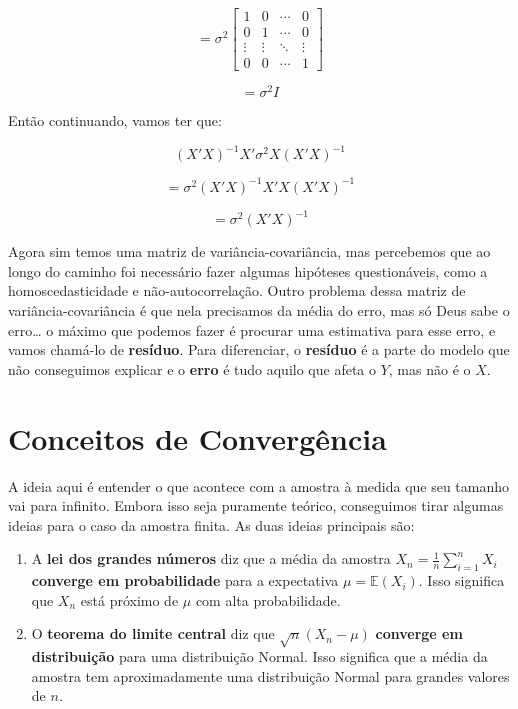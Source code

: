 \documentclass[
  letterpaper,
  DIV=11,
  numbers=noendperiod]{scrreprt}
\providecommand{\tightlist}{%
  \setlength{\itemsep}{0pt}\setlength{\parskip}{0pt}}\usepackage{longtable,booktabs,array}
\theoremstyle{definition}
\theoremstyle{plain}
\theoremstyle{remark}
\begin{document}
\[
= \sigma^{2} \begin{bmatrix}
1 & 0 & \cdots & 0 \\
0 & 1 & \cdots & 0 \\
\vdots & \vdots & \ddots & \vdots \\
0 & 0 & \cdots & 1
\end{bmatrix}
\]

\[
= \sigma^{2} I
\]

Então continuando, vamos ter que:

\[
(X' X)^{-1} X' \sigma^{2} X(X' X)^{-1}
\]

\[
= \sigma^{2} (X' X)^{-1} X' X(X' X)^{-1}
\]

\[
= \sigma^{2} (X' X)^{-1}
\]

Agora sim temos uma matriz de variância-covariância, mas percebemos que
ao longo do caminho foi necessário fazer algumas hipóteses
questionáveis, como a homoscedasticidade e não-autocorrelação. Outro
problema dessa matriz de variância-covariância é que nela precisamos da
média do erro, mas só Deus sabe o erro\ldots{} o máximo que podemos
fazer é procurar uma estimativa para esse erro, e vamos chamá-lo de
\textbf{resíduo}. Para diferenciar, o \textbf{resíduo} é a parte do
modelo que não conseguimos explicar e o \textbf{erro} é tudo aquilo que
afeta o \(Y\), mas não é o \(X\).

\section{Conceitos de Convergência}\label{conceitos-de-converguxeancia}

A ideia aqui é entender o que acontece com a amostra à medida que seu
tamanho vai para infinito. Embora isso seja puramente teórico,
conseguimos tirar algumas ideias para o caso da amostra finita. As duas
ideias principais são:

\begin{enumerate}
\def\labelenumi{\arabic{enumi}.}
\tightlist
\item
  A \textbf{lei dos grandes números} diz que a média da amostra
  \(X_n = \frac{1}{n} \sum_{i=1}^n X_i\) \textbf{converge em
  probabilidade} para a expectativa \(\mu = \mathbb{E}(X_i)\). Isso
  significa que \(X_n\) está próximo de \(\mu\) com alta probabilidade.
\item
  O \textbf{teorema do limite central} diz que \(\sqrt{n}(X_n - \mu)\)
  \textbf{converge em distribuição} para uma distribuição Normal. Isso
  significa que a média da amostra tem aproximadamente uma distribuição
  Normal para grandes valores de \(n\).
\end{enumerate}
\end{document}
